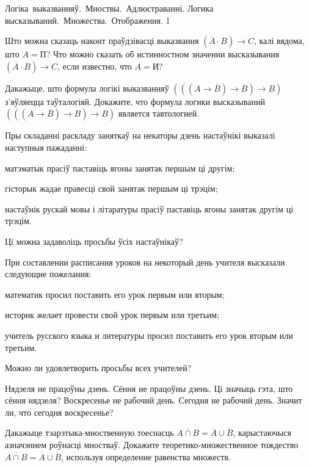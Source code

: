 



\quizTitle
{Логіка~выказванняў.~Мноствы.~Адлюстраванні.}
{Логика высказываний.~Множества.~Отображения.}
{1}

\begin{problemList}
	
\problemItemSimple
{Што можна сказаць наконт праўдзівасці выказвання $(\overline{A} \cdot B) \to C$, калі вядома, што $A = \mbox{П}$?}
{Что можно сказать об истинностном значении высказывания $(\overline{A} \cdot B) \to C$, если известно, что $A = \mbox{И}$?}

\problemItemSimple
{Дакажыце, што формула логікі выказванняў $(((A \to \overline{B}) \to B) \to B)$ з'яўляецца таўталогіяй.}
{Докажите, что формула логики высказываний $(((A \to \overline{B}) \to B) \to B)$ является тавтологией.}

\problemItemSimple
{Пры складанні раскладу заняткаў на некаторы дзень настаўнікі выказалі наступныя пажаданні:
\begin{belarusianEnumerate}
	\item матэматык прасіў паставіць ягоны занятак першым ці другім;
	\item гісторык жадае правесці свой занятак першым ці трэцім;
	\item настаўнік рускай мовы і літаратуры прасіў паставіць ягоны занятак другім ці трэцім.
\end{belarusianEnumerate}
Ці можна задаволіць просьбы ўсіх настаўнікаў?}
{При составлении расписания уроков на некоторый день учителя высказали следующие пожелания:
\begin{russianEnumerate}
	\item математик просил поставить его урок первым или вторым;
	\item историк желает провести свой урок первым или третьим;
	\item учитель русского языка и литературы просил поставить его урок вторым или третьим.
\end{russianEnumerate}
Можно ли удовлетворить просьбы всех учителей?}

\problemItemSimple
{Нядзеля не працоўны дзень. Сёння не працоўны дзень. Ці значыць гэта, што сёння нядзеля?}
{Воскресенье не рабочий день. Сегодня не рабочий день. Значит ли, что сегодня воскресенье?}

\problemItemSimple
{Дакажыце тэарэтыка-мноственную тоеснасць $\overline{A \cap B} = \overline{A} \cup \overline{B}$, карыстаючыся азначэннем роўнасці мностваў.}
{Докажите теоретико-множественное тождество $\overline{A \cap B} = \overline{A} \cup \overline{B}$, используя определение равенства множеств.}


\end{problemList}
